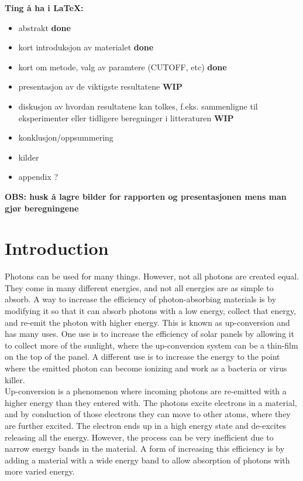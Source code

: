 \documentclass{article}
\begin{document}

\textbf{Ting å ha i \LaTeX:}
\begin{itemize}
    \item abstrakt
    \subitem \textbf{done}
    \item kort introduksjon av materialet
    \subitem \textbf{done}
    \item kort om metode, valg av paramtere (CUTOFF, etc)
    \subitem \textbf{done}
    \item presentasjon av de viktigste resultatene
    \subitem \textbf{WIP}
    \item diskusjon av hvordan resultatene kan tolkes, f.eks. sammenligne til eksperimenter eller tidligere beregninger i litteraturen
    \subitem \textbf{WIP}
    \item konklusjon/oppsummering
    \item kilder
    \item appendix ?
\end{itemize}

\vspace{1cm}

\textbf{\large{OBS: husk å lagre bilder for rapporten og presentasjonen mens man gjør beregningene}}

\section{Introduction}  \label{sec:Introduction}

    Photons can be used for many things. However, not all photons are created equal. They come in many different energies, and not all energies are as simple to absorb. A way to increase the efficiency of photon-absorbing materials is by modifying it so that it can absorb photons with a low energy, collect that energy, and re-emit the photon with higher energy. This is known as up-conversion and has many uses. One use is to increase the efficiency of solar panels by allowing it to collect more of the sunlight, where the up-conversion system can be a thin-film on the top of the panel. A different use is to increase the energy to the point where the emitted photon can become ionizing and work as a bacteria or virus killer.\\

    Up-conversion is a phenomenon where incoming photons are re-emitted with a higher energy than they entered with. The photons excite electrons in a material, and by conduction of those electrons they can move to other atoms, where they are further excited. The electron ends up in a high energy state and de-excites releasing all the energy. However, the process can be very inefficient due to narrow energy bands in the material. A form of increasing this efficiency is by adding a material with a wide energy band to allow absorption of photons with more varied energy.\\
\end{document}
